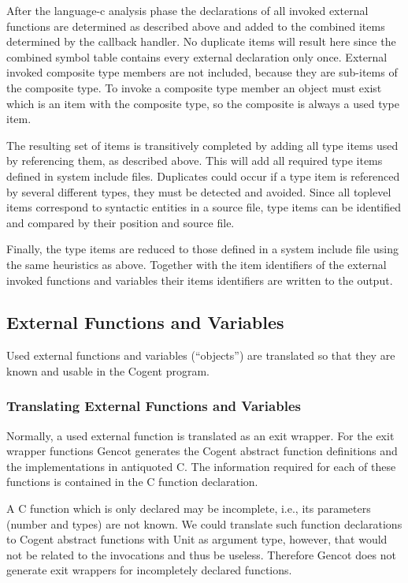 After the language-c analysis phase the declarations of all invoked external functions are determined 
as described above and added to the combined items determined by the callback handler. No duplicate items
will result here since the combined symbol table contains every external declaration only once.
External invoked composite type members are not included, because they are sub-items of the composite type. To invoke 
a composite type member an object must exist which is an item with the composite type, so the composite is always 
a used type item.

The resulting set of items is transitively completed by adding all type items used by referencing them,
as described above. This will add all required type items defined in system include files.
Duplicates could occur if a type item is referenced
by several different types, they must be detected and avoided. Since all toplevel items correspond to 
syntactic entities in a source file, type items can be identified and compared by their position and source file.

Finally, the type items are reduced to those defined in a system include file using the same
heuristics as above. Together with the item identifiers of the external invoked functions and variables their items
identifiers are written to the output.

\subsection{External Functions and Variables}
\label{impl-ccomps-externs}

Used external functions and variables (``objects'') are translated so that they are known and usable
in the Cogent program.

\subsubsection{Translating External Functions and Variables}

Normally, a used external function is translated as an exit wrapper.
For the exit wrapper functions Gencot generates the Cogent abstract function definitions and the implementations
in antiquoted C. 
The information required for each of these functions is contained in the C function declaration.

A C function which is only declared may be incomplete, i.e., its parameters (number and types) are not known. 
We could translate such function declarations to Cogent abstract functions with Unit as argument type, however,
that would not be related to the invocations and thus be useless. Therefore Gencot does not generate exit 
wrappers for incompletely declared functions.

